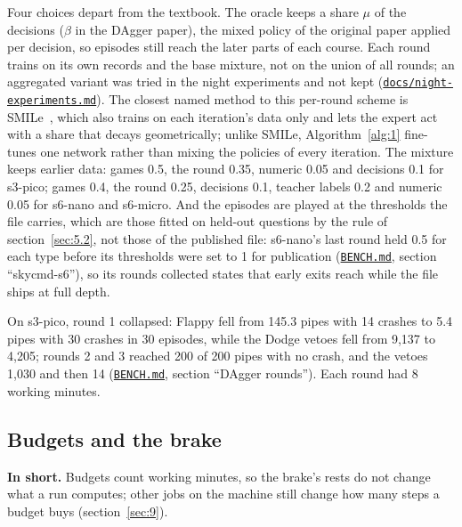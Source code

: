 \documentclass[10pt]{article}
\begin{document}
Four choices depart from the textbook. The oracle keeps a share $\mu$ of the decisions ($\beta$ in the DAgger paper), the mixed policy of the original paper applied per decision, so episodes still reach the later parts of each course. Each round trains on its own records and the base mixture, not on the union of all rounds; an aggregated variant was tried in the night experiments and not kept (\href{https://github.com/maxgfr/skycmd/blob/main/docs/night-experiments.md}{\texttt{docs/\allowbreak{}night-experiments.md}}). The closest named method to this per-round scheme is SMILe~\cite{ross2010efficient}, which also trains on each iteration's data only and lets the expert act with a share that decays geometrically; unlike SMILe, Algorithm~\ref{alg:1} fine-tunes one network rather than mixing the policies of every iteration. The mixture keeps earlier data: games 0.5, the round 0.35, numeric 0.05 and decisions 0.1 for s3-pico; games 0.4, the round 0.25, decisions 0.1, teacher labels 0.2 and numeric 0.05 for s6-nano and s6-micro. And the episodes are played at the thresholds the file carries, which are those fitted on held-out questions by the rule of section~\ref{sec:5.2}, not those of the published file: s6-nano's last round held 0.5 for each type before its thresholds were set to 1 for publication (\href{https://github.com/maxgfr/skycmd/blob/main/BENCH.md}{\texttt{BENCH.md}}, section ``skycmd-s6''), so its rounds collected states that early exits reach while the file ships at full depth.

On s3-pico, round 1 collapsed: Flappy fell from 145.3 pipes with 14 crashes to 5.4 pipes with 30 crashes in 30 episodes, while the Dodge vetoes fell from 9,137 to 4,205; rounds 2 and 3 reached 200 of 200 pipes with no crash, and the vetoes 1,030 and then 14 (\href{https://github.com/maxgfr/skycmd/blob/main/BENCH.md}{\texttt{BENCH.md}}, section ``DAgger rounds''). Each round had 8 working minutes.

\subsection{Budgets and the brake}\label{sec:4.6}

\textbf{In short.} Budgets count working minutes, so the brake's rests do not change what a run computes; other jobs on the machine still change how many steps a budget buys (section~\ref{sec:9}).
\end{document}
